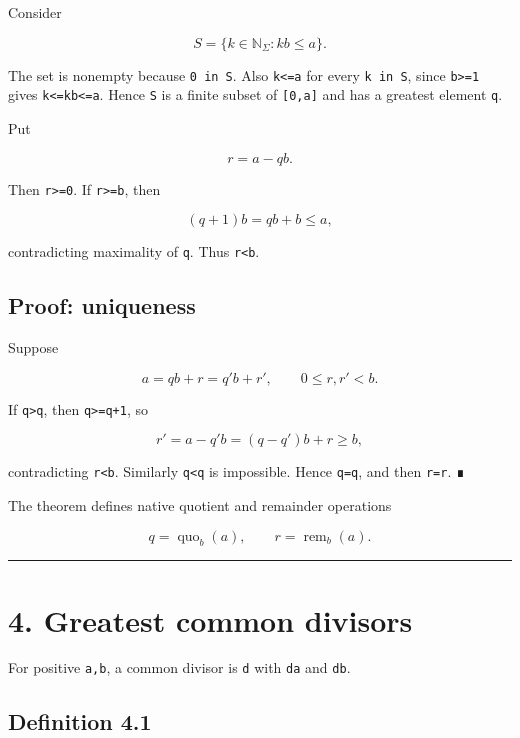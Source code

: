 Consider

\[
S=\{k\in\mathbb N_\Sigma:kb\le a\}.
\]

The set is nonempty because \texttt{0\ in\ S}. Also \texttt{k\textless{}=a} for every \texttt{k\ in\ S}, since
\texttt{b\textgreater{}=1} gives \texttt{k\textless{}=kb\textless{}=a}. Hence \texttt{S} is a finite subset of \texttt{{[}0,a{]}} and has a
greatest element \texttt{q}.

Put

\[
r=a-qb.
\]

Then \texttt{r\textgreater{}=0}. If \texttt{r\textgreater{}=b}, then

\[
(q+1)b=qb+b\le a,
\]

contradicting maximality of \texttt{q}. Thus \texttt{r\textless{}b}.

\hypertarget{proof-uniqueness}{%
\subsection{Proof: uniqueness}\label{proof-uniqueness}}

Suppose

\[
a=qb+r=q'b+r',
\qquad
0\le r,r'<b.
\]

If \texttt{q\textgreater{}q\textquotesingle{}}, then \texttt{q\textgreater{}=q\textquotesingle{}+1}, so

\[
r'=a-q'b=(q-q')b+r\ge b,
\]

contradicting \texttt{r\textquotesingle{}\textless{}b}. Similarly \texttt{q\textquotesingle{}\textless{}q} is impossible. Hence \texttt{q=q\textquotesingle{}}, and then
\texttt{r=r\textquotesingle{}}. ∎

The theorem defines native quotient and remainder operations

\[
q=\operatorname{quo}_b(a),
\qquad
r=\operatorname{rem}_b(a).
\]

\begin{center}\rule{0.5\linewidth}{0.5pt}\end{center}

\hypertarget{greatest-common-divisors}{%
\section{4. Greatest common divisors}\label{greatest-common-divisors}}

For positive \texttt{a,b}, a common divisor is \texttt{d} with \texttt{d\textbar{}a} and \texttt{d\textbar{}b}.

\hypertarget{definition-4.1}{%
\subsection{Definition 4.1}\label{definition-4.1}}

